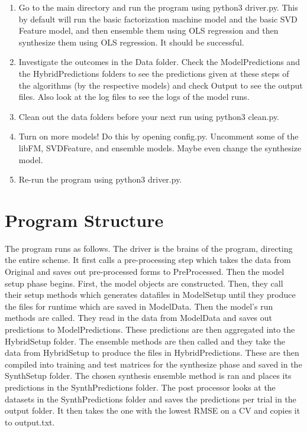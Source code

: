 \documentclass{article}
\begin{document}
\begin{enumerate}
\item Go to the main directory and run the program using python3 driver.py. This by default will run the basic factorization machine model and the basic SVD Feature model, and then ensemble them using OLS regression and then synthesize them using OLS regression. It should be successful.
\item Investigate the outcomes in the Data folder. Check the ModelPredictions and the HybridPredictions folders to see the predictions given at these steps of the algorithms (by the respective models) and check Output to see the output files. Also look at the log files to see the logs of the model runs.
\item Clean out the data folders before your next run using python3 clean.py.
\item  Turn on more models! Do this by opening config.py. Uncomment some of the libFM, SVDFeature, and ensemble models. Maybe even change the synthesize model.
\item Re-run the program using python3 driver.py. 
\end{enumerate}

\section{Program Structure}

The program runs as follows. The driver is the brains of the program,
directing the entire scheme. It first calls a pre-processing step which
takes the data from Original and saves out pre-processed forms to
PreProcessed. Then the model setup phase begins. First, the model
objects are constructed. Then, they call their setup methods which
generates datafiles in ModelSetup until they produce the files for
runtime which are saved in ModelData. Then the model's run methods are
called. They read in the data from ModelData and saves out predictions
to ModelPredictions. These predictions are then aggregated into the
HybridSetup folder. The ensemble methods are then called and they take
the data from HybridSetup to produce the files in HybridPredictions. These are then compiled into training and test matrices for the synthesize phase and saved in the SynthSetup folder. The chosen synthesis ensemble method is ran and places its predictions in the SynthPredictions folder. The post processor looks at the
datasets in the SynthPredictions folder and saves the predictions per trial in the output folder. It then takes the one with the lowest RMSE on a CV and copies it to output.txt.
\end{document}
